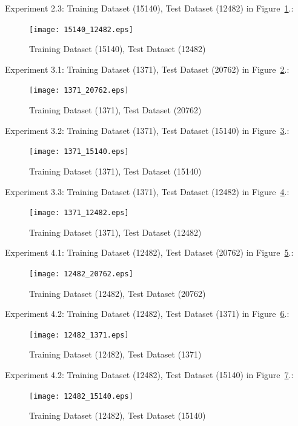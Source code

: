 Experiment 2.3: Training Dataset  (15140), Test Dataset  (12482) in Figure~\ref{fig:fig5}.:
\begin{figure}[h]
\centering
\texttt{[image: 15140\_12482.eps]}
\caption{Training Dataset  (15140), Test Dataset  (12482) }
\label{fig:fig5}
\end{figure}

Experiment 3.1: Training Dataset  (1371), Test Dataset  (20762) in Figure~\ref{fig:fig6}.:
\begin{figure}[h]
\centering
\texttt{[image: 1371\_20762.eps]}
\caption{ Training Dataset  (1371), Test Dataset  (20762)}
\label{fig:fig6}
\end{figure}

Experiment 3.2: Training Dataset  (1371), Test Dataset  (15140) in Figure~\ref{fig:fig7}.:
\begin{figure}[h]
\centering
\texttt{[image: 1371\_15140.eps]}
\caption{Training Dataset  (1371), Test Dataset  (15140)}
\label{fig:fig7}
\end{figure}

Experiment 3.3: Training Dataset  (1371), Test Dataset  (12482) in Figure~\ref{fig:fig8}.:
\begin{figure}[h]
\centering
\texttt{[image: 1371\_12482.eps]}
\caption{Training Dataset  (1371), Test Dataset  (12482)}
\label{fig:fig8}
\end{figure}

Experiment 4.1: Training Dataset  (12482), Test Dataset  (20762) in Figure~\ref{fig:fig9}.:
\begin{figure}[h]
\centering
\texttt{[image: 12482\_20762.eps]}
\caption{Training Dataset  (12482), Test Dataset  (20762)}
\label{fig:fig9}
\end{figure}

Experiment 4.2: Training Dataset  (12482), Test Dataset  (1371) in Figure~\ref{fig:fig10}.:
\begin{figure}[h]
\centering
\texttt{[image: 12482\_1371.eps]}
\caption{Training Dataset  (12482), Test Dataset  (1371)}
\label{fig:fig10}
\end{figure}

Experiment 4.2: Training Dataset  (12482), Test Dataset  (15140) in Figure~\ref{fig:fig11}.:
\begin{figure}[h]
\centering
\texttt{[image: 12482\_15140.eps]}
\caption{Training Dataset  (12482), Test Dataset  (15140)}
\label{fig:fig11}
\end{figure}

\fi


